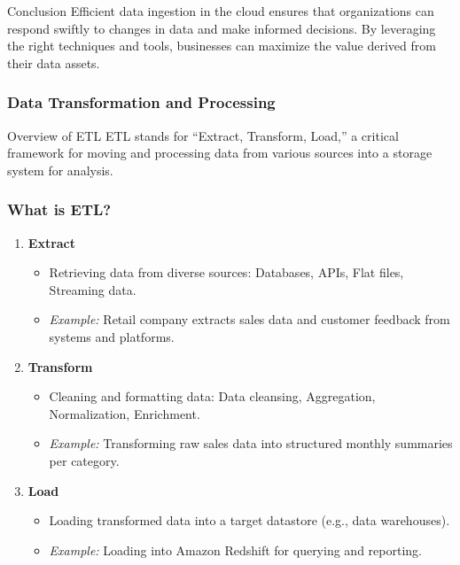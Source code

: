 \documentclass[aspectratio=169]{beamer}
\begin{document}
\begin{frame}[fragile]{Conclusion}
  Efficient data ingestion in the cloud ensures that organizations can respond swiftly to changes in data and make informed decisions. By leveraging the right techniques and tools, businesses can maximize the value derived from their data assets.
\end{frame}

\begin{frame}[fragile]
    \frametitle{Data Transformation and Processing}
    \begin{block}{Overview of ETL}
        ETL stands for ``Extract, Transform, Load,'' a critical framework for moving and processing data from various sources into a storage system for analysis.
    \end{block}
\end{frame}

\begin{frame}[fragile]
    \frametitle{What is ETL?}
    \begin{enumerate}
        \item \textbf{Extract}
            \begin{itemize}
                \item Retrieving data from diverse sources: Databases, APIs, Flat files, Streaming data.
                \item \textit{Example:} Retail company extracts sales data and customer feedback from systems and platforms.
            \end{itemize}
            
        \item \textbf{Transform}
            \begin{itemize}
                \item Cleaning and formatting data: Data cleansing, Aggregation, Normalization, Enrichment.
                \item \textit{Example:} Transforming raw sales data into structured monthly summaries per category.
            \end{itemize}

        \item \textbf{Load}
            \begin{itemize}
                \item Loading transformed data into a target datastore (e.g., data warehouses).
                \item \textit{Example:} Loading into Amazon Redshift for querying and reporting.
            \end{itemize}
    \end{enumerate}
\end{frame}
\end{document}
